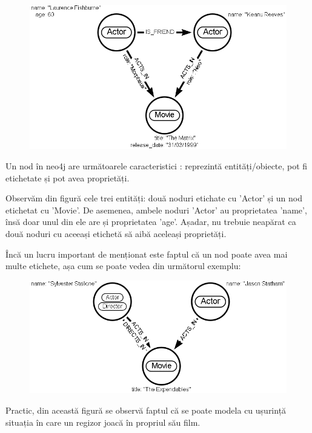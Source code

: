 \documentclass[12pt,a4paper]{report}
\begin{document}
\begin{figure}[h]
\centering
\caption{}
\includegraphics[scale=0.5]{exemplu_1_neo4j}
\caption*{}
\end{figure}


Un nod în neo4j are următoarele caracteristici \cite{6}: reprezintă entități/obiecte, pot fi etichetate și pot avea proprietăți.

Observăm din figură cele trei entități: două noduri etichate cu 'Actor' și un nod etichetat cu 'Movie'. De asemenea, ambele noduri 'Actor' au proprietatea 'name', însă doar unul din ele are și proprietatea 'age'. Așadar, nu trebuie neapărat ca două noduri cu aceeași etichetă să aibă aceleași proprietăți.

Încă un lucru important de menționat este faptul că un nod poate avea mai multe etichete, așa cum se poate vedea din următorul exemplu:


\begin{figure}[h]
\centering
\caption{}
\includegraphics[scale=0.5]{exemplu_2_neo4j}
\caption*{}
\end{figure}


Practic, din această figură se observă faptul că se poate modela cu ușurință situația în care un regizor joacă în propriul său film.
\end{document}
